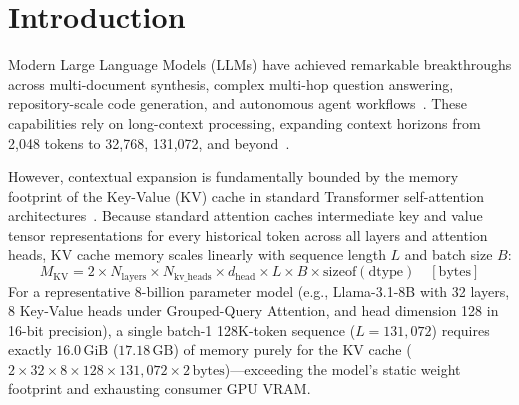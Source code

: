 \documentclass[10pt]{article}
\theoremstyle{definition}
\begin{document}
\section{Introduction}
\label{sec:introduction}

Modern Large Language Models (LLMs) have achieved remarkable breakthroughs across multi-document synthesis, complex multi-hop question answering, repository-scale code generation, and autonomous agent workflows~\citep{brown2020language,achiam2023gpt4,touvron2023llama,bai2023qwen}. These capabilities rely on long-context processing, expanding context horizons from 2,048 tokens to 32,768, 131,072, and beyond~\citep{reid2024gemini,deepseek2024v2}.

However, contextual expansion is fundamentally bounded by the memory footprint of the Key-Value (KV) cache in standard Transformer self-attention architectures~\citep{vaswani2017attention}. Because standard attention caches intermediate key and value tensor representations for every historical token across all layers and attention heads, KV cache memory scales linearly with sequence length $L$ and batch size $B$:
\begin{equation}
\label{eq:kv_size_intro}
M_{\text{KV}} = 2 \times N_{\text{layers}} \times N_{\text{kv\_heads}} \times d_{\text{head}} \times L \times B \times \text{sizeof}(\text{dtype}) \quad [\text{bytes}]
\end{equation}
For a representative 8-billion parameter model (e.g., Llama-3.1-8B with 32 layers, 8 Key-Value heads under Grouped-Query Attention, and head dimension 128 in 16-bit precision), a single batch-1 128K-token sequence ($L = 131{,}072$) requires exactly $16.0\,\text{GiB}$ ($17.18\,\text{GB}$) of memory purely for the KV cache ($2 \times 32 \times 8 \times 128 \times 131{,}072 \times 2\,\text{bytes}$)---exceeding the model's static weight footprint and exhausting consumer GPU VRAM.
\end{document}
